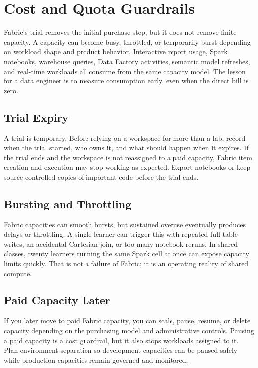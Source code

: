 \section{Cost and Quota Guardrails}
Fabric's trial removes the initial purchase step, but it does not remove finite capacity. A capacity can become busy, throttled, or temporarily burst depending on workload shape and product behavior. Interactive report usage, Spark notebooks, warehouse queries, Data Factory activities, semantic model refreshes, and real-time workloads all consume from the same capacity model. The lesson for a data engineer is to measure consumption early, even when the direct bill is zero.

\subsection{Trial Expiry}
A trial is temporary. Before relying on a workspace for more than a lab, record when the trial started, who owns it, and what should happen when it expires. If the trial ends and the workspace is not reassigned to a paid capacity, Fabric item creation and execution may stop working as expected. Export notebooks or keep source-controlled copies of important code before the trial ends.

\subsection{Bursting and Throttling}
Fabric capacities can smooth bursts, but sustained overuse eventually produces delays or throttling. A single learner can trigger this with repeated full-table writes, an accidental Cartesian join, or too many notebook reruns. In shared classes, twenty learners running the same Spark cell at once can expose capacity limits quickly. That is not a failure of Fabric; it is an operating reality of shared compute.

\subsection{Paid Capacity Later}
If you later move to paid Fabric capacity, you can scale, pause, resume, or delete capacity depending on the purchasing model and administrative controls. Pausing a paid capacity is a cost guardrail, but it also stops workloads assigned to it. Plan environment separation so development capacities can be paused safely while production capacities remain governed and monitored.

